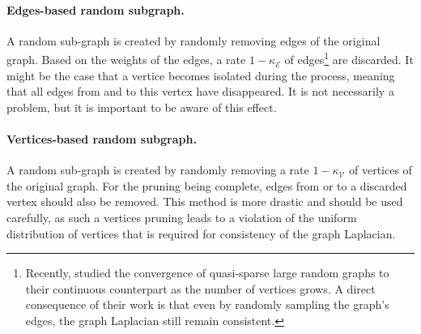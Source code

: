 \documentclass{article}
\begin{document}
\paragraph{Edges-based random subgraph.} 
A random sub-graph is created by randomly removing edges of the original graph. Based on the weights of the edges, a rate $1 - \kappa_\mathcal{E}$ of edges\footnote{Recently, \cite{keriven2020convergence} studied the convergence of quasi-sparse large random graphs to their continuous counterpart as the number of vertices grows. A direct consequence of their work is that even by randomly sampling the graph's edges, the graph Laplacian still remain consistent.} are discarded. It might be the case that a vertice becomes isolated during the process, meaning that all edges from and to this vertex have disappeared. It is not necessarily a problem, but it is important to be aware of this effect. 
\paragraph{Vertices-based random subgraph.}  
A random sub-graph is created by randomly removing a rate $1-\kappa_\mathcal{V}$ of vertices of the original graph. For the pruning being complete, edges from or to a discarded vertex should also be removed. This method is more drastic and should be used carefully, as such a vertices pruning leads to a violation of the uniform distribution of vertices that is required for consistency of the graph Laplacian. 
\end{document}
